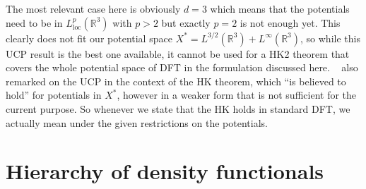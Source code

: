 \documentclass[journal=apcach,manuscript=article,layout=twocolumn]{achemso}
\newcommand{\R}{\mathbb{R}}
\newcommand{\loc}{\mathrm{loc}}
\begin{document}
The most relevant case here is obviously $d=3$ which means that the potentials need to be in $L_{\loc}^p(\R^3)$ with $p>2$ but exactly $p=2$ is not enough yet. This clearly does not fit our potential space $X^* = L^{3/2}(\R^3) + L^\infty(\R^3)$, so while this UCP result is the best one available, it cannot be used for a HK2 theorem that covers the whole potential space of DFT in the formulation discussed here.
\citeauthor{Lieb1983}~\cite{Lieb1983} also remarked on the UCP in the context of the HK theorem, which ``is believed to hold'' for potentials in $X^*$, however in a weaker form that is not sufficient for the current purpose. So whenever we state that the HK holds in standard DFT, we actually mean under the given restrictions on the potentials.

\section{Hierarchy of density functionals}
\label{sec:functionals}
\end{document}
